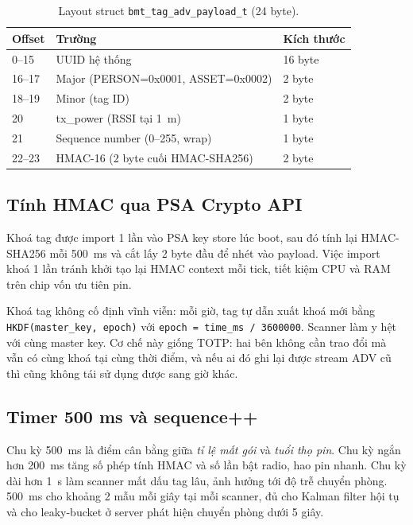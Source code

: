 \begin{table}[htp]
    \centering
    \caption{Layout struct \texttt{bmt\_tag\_adv\_payload\_t} (24 byte).}
    \label{tab:tag-payload}
    \begin{tabular}{lll}
        \hline
        \textbf{Offset} & \textbf{Trường} & \textbf{Kích thước} \\
        \hline
        0--15  & UUID hệ thống                     & 16 byte \\
        16--17 & Major (PERSON=0x0001, ASSET=0x0002) & 2 byte \\
        18--19 & Minor (tag ID)                     & 2 byte \\
        20     & tx\_power (RSSI tại 1~m)          & 1 byte \\
        21     & Sequence number (0--255, wrap)    & 1 byte \\
        22--23 & HMAC-16 (2 byte cuối HMAC-SHA256) & 2 byte \\
        \hline
    \end{tabular}
\end{table}

\subsection{Tính HMAC qua PSA Crypto API}

Khoá tag được import 1 lần vào PSA key store lúc boot, sau đó tính lại HMAC-SHA256 mỗi 500~ms và cắt lấy 2 byte đầu để nhét vào payload. Việc import khoá 1 lần tránh khởi tạo lại HMAC context mỗi tick, tiết kiệm CPU và RAM trên chip vốn ưu tiên pin.

Khoá tag không cố định vĩnh viễn: mỗi giờ, tag tự dẫn xuất khoá mới bằng \texttt{HKDF(master\_key, epoch)} với \texttt{epoch = time\_ms / 3600000}. Scanner làm y hệt với cùng master key. Cơ chế này giống TOTP: hai bên không cần trao đổi mà vẫn có cùng khoá tại cùng thời điểm, và nếu ai đó ghi lại được stream ADV cũ thì cũng không tái sử dụng được sang giờ khác.

\subsection{Timer 500 ms và sequence++}

Chu kỳ 500~ms là điểm cân bằng giữa \textit{tỉ lệ mất gói} và \textit{tuổi thọ pin}. Chu kỳ ngắn hơn 200~ms tăng số phép tính HMAC và số lần bật radio, hao pin nhanh. Chu kỳ dài hơn 1~s làm scanner mất dấu tag lâu, ảnh hưởng tới độ trễ chuyển phòng. 500~ms cho khoảng 2 mẫu mỗi giây tại mỗi scanner, đủ cho Kalman filter hội tụ và cho leaky-bucket ở server phát hiện chuyển phòng dưới 5 giây.

